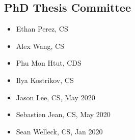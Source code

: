 \documentclass[a4paper,11pt]{article}
\begin{document}
\subsection{PhD Thesis Committee}
\begin{itemize}[itemsep=-5pt]
    \item Ethan Perez, CS
    \item Alex Wang, CS
    \item Phu Mon Htut, CDS 
    \item Ilya Kostrikov, CS
    \item Jason Lee, CS, May 2020 
    \item Sebastien Jean, CS, May 2020
    \item Sean Welleck, CS, Jan 2020
\end{itemize}
\end{document}
